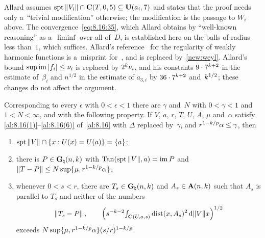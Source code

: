 \begin{remark}
    \label{rem:8.16}
    Allard assumes $\operatorname{spt} \|V_i\| \cap \mathbf{C} ( T, 0, 5 ) \subseteq \mathbf{U}(a_i,7)$ and states that
    the proof needs only a~``trivial modification'' otherwise; the modification is the passage to
    $W_i$ above. The convergence~\eqref{eq:8.16:35}, which Allard obtains by ``well-known
    reasoning'' as a~$\liminf$ over all of~$D$, is established here on the balls of radius less
    than~$1$, which suffices. Allard's reference~\cite[2.5.6]{Federer1969} for the regularity of
    weakly harmonic functions is a~misprint for~\cite[5.2.6]{Federer1969}, and is replaced
    by~\ref{new:weyl}. Allard's bound $\sup \operatorname{im} |f_i| \le \nu_i$ is replaced by $2^{k} \nu_i$, and
    his constants $9 \cdot 7^{k+2}$ in the estimate of~$\beta_i$ and $n^{1/2}$ in the estimate
    of $a_{3,i}$ by $36 \cdot 7^{k+2}$ and~$k^{1/2}$; these changes do not affect the
    argument.
\end{remark}

\begin{corollary}
    \label{al:8.17}
    Corresponding to every $\epsilon$ with $0 < \epsilon < 1$ there are $\gamma$ and~$N$ with $0 <
    \gamma < 1$ and $1 < N < \infty$, and with the following property. If $V$, $a$, $r$, $T$, $U$,
    $A$, $\mu$ and~$\alpha$ satisfy \ref{al:8.16(1)}--\ref{al:8.16(6)} of~\ref{al:8.16} with $\Delta$
    replaced by~$\gamma$, and $r^{1 - k/p} \alpha \le \gamma$, then
    \begin{enumerate}[label=(\arabic*)]
        \item \label{al:8.17(1)} $\operatorname{spt} \|V\| \cap \{ x : U(x) = U(a) \} = \{ a \}$;
        \item \label{al:8.17(2)} there is $P \in \mathbf{G}_{\natural}(n,k)$ with $\operatorname{Tan}(\operatorname{spt} \|V\|, a) =
            \operatorname{im} P$ and $\|T - P\| \le N \sup \{ \mu, r^{1 - k/p} \alpha \}$;
        \item \label{al:8.17(3)} whenever $0 < s < r$, there are $T_s \in \mathbf{G}_{\natural}(n,k)$ and
            $A_s \in \mathbf{A}(n,k)$ such that $A_s$ is parallel to $T_s$ and neither of the
            numbers
            \begin{displaymath}
                \|T_s - P\| \,, \qquad \Big( s^{-k-2} {\textstyle\int_{\mathbf{C} ( U, a, s )}^{}} \operatorname{dist}(x,
                A_s)^2 \,\mathrm{d} \|V\| x \Big)^{1/2}
            \end{displaymath}
            exceeds $N \sup \{ \mu, r^{1 - k/p} \alpha \} (s/r)^{1 - k/p}$.
    \end{enumerate}
\end{corollary}

